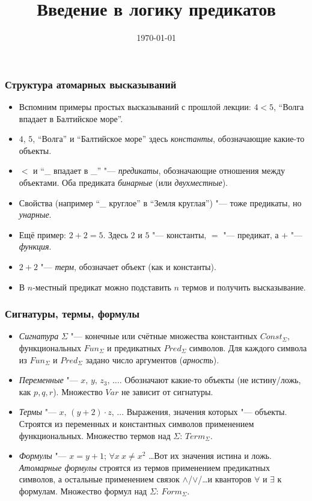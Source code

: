 \documentclass[10pt]{beamer}
\title{Введение в логику предикатов}
\date{\today}
\begin{document}
\begin{frame}[plain]
\maketitle
\end{frame}

\begin{frame}
    \frametitle{Структура атомарных высказываний}
    \begin{itemize}
        \item Вспомним примеры простых высказываний с прошлой лекции: $4<5$, \enquote{Волга впадает в Балтийское море}.
        \pause
        \item $4$, $5$, \enquote{Волга} и \enquote{Балтийское море} здесь \emph{константы}, обозначающие какие-то объекты.
        \item $<$ и \enquote{\_ впадает в \_} "--- \emph{предикаты}, обозначающие отношения между объектами. Оба предиката \emph{бинарные} (или \emph{двухместные}).
        \pause
        \item Свойства (например \enquote{\_ круглое} в \enquote{Земля круглая}) "--- тоже предикаты, но \emph{унарные}.
        \pause
        \item Ещё пример: $2+2=5$. Здесь $2$ и $5$ "--- \pause константы, $=$ "--- \pause предикат, а $+$ "--- \pause \emph{функция}.
        \item $2+2$ "--- \emph{терм}, обозначает объект (как и константы).
        \item В $n$-местный предикат можно подставить $n$ термов и получить высказывание.
    \end{itemize}
\end{frame}

\begin{frame}
    \frametitle{Сигнатуры, термы, формулы}
    \begin{itemize}
        \item \emph{Сигнатура} $\Sigma$ "--- конечные или счётные множества константных $Const_\Sigma$, функциональных $Fun_\Sigma$ и предикатных $Pred_\Sigma$ символов. Для каждого символа из $Fun_\Sigma$ и $Pred_\Sigma$ задано число аргументов (\emph{арность}).
        \item \emph{Переменные} "--- \pause $x,\,y,\,z_3,\,\ldots$. Обозначают \pause какие-то объекты (не истину/ложь, как $p,q,r$). Множество $Var$ не зависит от сигнатуры. \pause
        \item \emph{Термы} "--- \pause $x,\,(y+2) \cdot z,\,\ldots$ Выражения, значения которых "--- объекты. Строятся из переменных и константных символов применением функциональных. Множество термов над $\Sigma$: $Term_\Sigma$. \pause
        \item \emph{Формулы} "--- \pause $x=y+1$; $\forall x ~ x \neq x^2$ \ldots Вот их значения истина и ложь. \emph{Атомарные формулы} строятся из термов применением предикатных символов, а остальные  применением связок $\land$/$\lor$/\ldots и кванторов $\forall$ и $\exists$ к формулам. Множество формул над $\Sigma$: $Form_\Sigma$.
    \end{itemize}
\end{frame}
\end{document}
